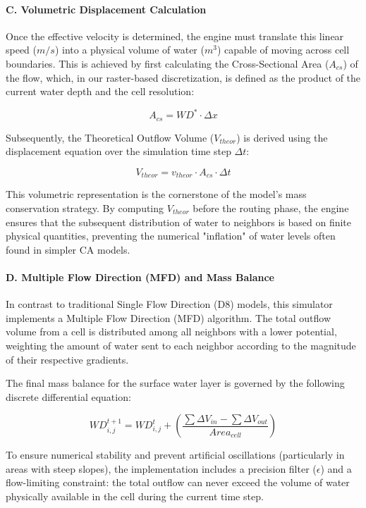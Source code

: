 \paragraph{C. Volumetric Displacement Calculation}

Once the effective velocity is determined, the engine must translate this linear speed ($m/s$) into a physical volume of water ($m^3$) 
capable of moving across cell boundaries. This is achieved by first calculating the Cross-Sectional Area ($A_{cs}$) of the flow, which, 
in our raster-based discretization, is defined as the product of the current water depth and the cell resolution:

$$A_{cs} = WD^* \cdot \Delta x$$

Subsequently, the Theoretical Outflow Volume ($V_{theor}$) is derived using the displacement equation over the simulation time step 
$\Delta t$:

$$V_{theor} = v_{theor} \cdot A_{cs} \cdot \Delta t$$

This volumetric representation is the cornerstone of the model's mass conservation strategy. By computing $V_{theor}$ before the routing 
phase, the engine ensures that the subsequent distribution of water to neighbors is based on finite physical quantities, preventing the 
numerical "inflation" of water levels often found in simpler CA models.

\paragraph{D. Multiple Flow Direction (MFD) and Mass Balance}

In contrast to traditional Single Flow Direction (D8) models, this simulator implements a Multiple Flow Direction (MFD) algorithm. The 
total outflow volume from a cell is distributed among all neighbors with a lower potential, weighting the amount of water sent to each 
neighbor according to the magnitude of their respective gradients.

The final mass balance for the surface water layer is governed by the following discrete differential equation:

$$WD_{i,j}^{t+1} = WD_{i,j}^{t} + \left( \frac{\sum \Delta V_{in} - \sum \Delta V_{out}}{Area_{cell}} \right)$$

To ensure numerical stability and prevent artificial oscillations (particularly in areas with steep slopes), the implementation includes 
a precision filter ($\epsilon$) and a flow-limiting constraint: the total outflow can never exceed the volume of water physically 
available in the cell during the current time step.

